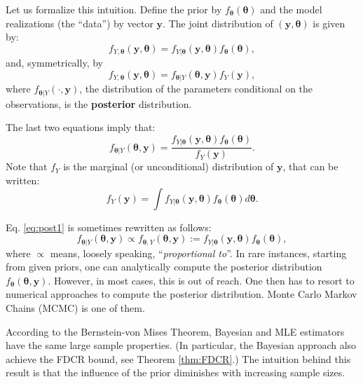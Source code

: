 \documentclass[
  12pt,
]{book}
\theoremstyle{definition}
\theoremstyle{definition}
\theoremstyle{definition}
\theoremstyle{definition}
\theoremstyle{remark}
\begin{document}
Let us formalize this intuition. Define the prior by \(f_{\boldsymbol\theta}({\boldsymbol\theta})\) and the model realizations (the ``data'') by vector \(\mathbf{y}\). The joint distribution of \((\mathbf{y},{\boldsymbol\theta})\) is given by:
\[
f_{Y,{\boldsymbol\theta}}(\mathbf{y},{\boldsymbol\theta}) = f_{Y|{\boldsymbol\theta}}(\mathbf{y},{\boldsymbol\theta})f_{\boldsymbol\theta}({\boldsymbol\theta}),
\]
and, symmetrically, by
\[
f_{Y,{\boldsymbol\theta}}(\mathbf{y},{\boldsymbol\theta}) = f_{{\boldsymbol\theta}|Y}({\boldsymbol\theta},\mathbf{y})f_Y(\mathbf{y}),
\]
where \(f_{{\boldsymbol\theta}|Y}(\cdot,\mathbf{y})\), the distribution of the parameters conditional on the observations, is the \textbf{posterior} distribution.

The last two equations imply that:
\begin{equation}
f_{{\boldsymbol\theta}|Y}({\boldsymbol\theta},\mathbf{y}) = \frac{f_{Y|{\boldsymbol\theta}}(\mathbf{y},{\boldsymbol\theta})f_{{\boldsymbol\theta}}({\boldsymbol\theta})}{f_Y(\mathbf{y})}.\label{eq:post1}
\end{equation}
Note that \(f_Y\) is the marginal (or unconditional) distribution of \(\mathbf{y}\), that can be written:
\begin{equation}
f_Y(\mathbf{y}) = \int f_{Y|{\boldsymbol\theta}}(\mathbf{y},{\boldsymbol\theta})f_{\boldsymbol\theta}({\boldsymbol\theta}) d {\boldsymbol\theta}.
\end{equation}

Eq. \eqref{eq:post1} is sometimes rewritten as follows:
\begin{equation}
f_{{\boldsymbol\theta}|Y}({\boldsymbol\theta},\mathbf{y}) \propto f_{{\boldsymbol\theta},Y}({\boldsymbol\theta},\mathbf{y}) := f_{Y|{\boldsymbol\theta}}(\mathbf{y},{\boldsymbol\theta})f_{\boldsymbol\theta}({\boldsymbol\theta}), \label{eq:post2}
\end{equation}
where \(\propto\) means, loosely speaking, ``\emph{proportional to}''. In rare instances, starting from given priors, one can analytically compute the posterior distribution \(f_{\boldsymbol\theta}({\boldsymbol\theta},\mathbf{y})\). However, in most cases, this is out of reach. One then has to resort to numerical approaches to compute the posterior distribution. Monte Carlo Markov Chains (MCMC) is one of them.

According to the Bernstein-von Mises Theorem, Bayesian and MLE estimators have the same large sample properties. (In particular, the Bayesian approach also achieve the FDCR bound, see Theorem \ref{thm:FDCR}.) The intuition behind this result is that the influence of the prior diminishes with increasing sample sizes.
\end{document}
